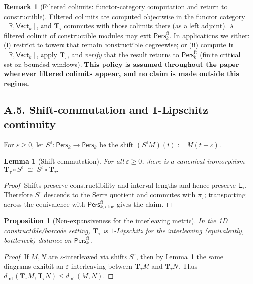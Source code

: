 \documentclass[11pt]{article}
\newcommand{\Pers}{\mathsf{Pers}}
\numberwithin{equation}{section}
\newtheorem{proposition}[theorem]{Proposition}
\newtheorem{lemma}[theorem]{Lemma}
\theoremstyle{definition}
\newtheorem{remark}[theorem]{Remark}
\begin{document}
\begin{remark}[Filtered colimits: functor-category computation and return to constructible]
\label{A:rk:filtered-colimits}
Filtered colimits are computed objectwise in the functor category \([\mathbb{R},\mathsf{Vect}_k]\), and \(\mathbf{T}_\tau\) commutes with those colimits there (as a left adjoint).
A filtered colimit of constructible modules may exit \(\Pers^{\mathrm{ft}}_k\).
In applications we either: (i) restrict to towers that remain constructible degreewise; or (ii) compute in \([\mathbb{R},\mathsf{Vect}_k]\), apply \(\mathbf{T}_\tau\), and \emph{verify} that the result returns to \(\Pers^{\mathrm{ft}}_k\) (finite critical set on bounded windows).
\textbf{This policy is assumed throughout the paper whenever filtered colimits appear, and no claim is made outside this regime.}
\end{remark}

\subsection*{A.5. Shift-commutation and 1-Lipschitz continuity}
For \(\varepsilon\ge 0\), let \(S^\varepsilon:\Pers_k\to\Pers_k\) be the shift \((S^\varepsilon M)(t):=M(t+\varepsilon)\).

\begin{lemma}[Shift commutation]\label{A:lem:shift}
For all \(\varepsilon\ge 0\), there is a canonical isomorphism
\(\mathbf{T}_\tau\circ S^\varepsilon \;\cong\; S^\varepsilon\circ \mathbf{T}_\tau.\)
\end{lemma}

\begin{proof}
Shifts preserve constructibility and interval lengths and hence preserve \(\mathsf{E}_\tau\).
Therefore \(S^\varepsilon\) descends to the Serre quotient and commutes with \(\pi_\tau\); transporting across the equivalence with \(\Pers^{\mathrm{ft}}_{k,\tau\text{-loc}}\) gives the claim.
\end{proof}

\begin{proposition}[Non-expansiveness for the interleaving metric]\label{A:prop:lipschitz}
In the 1D constructible/barcode setting, \(\mathbf{T}_\tau\) is \(1\)-Lipschitz for the interleaving (equivalently, bottleneck) distance on \(\Pers^{\mathrm{ft}}_k\).
\end{proposition}

\begin{proof}
If \(M,N\) are \(\varepsilon\)-interleaved via shifts \(S^\varepsilon\), then by Lemma~\ref{A:lem:shift} the same diagrams exhibit an \(\varepsilon\)-interleaving between \(\mathbf{T}_\tau M\) and \(\mathbf{T}_\tau N\).
Thus \(d_{\mathrm{int}}(\mathbf{T}_\tau M,\mathbf{T}_\tau N)\le d_{\mathrm{int}}(M,N)\).
\end{proof}
\end{document}
